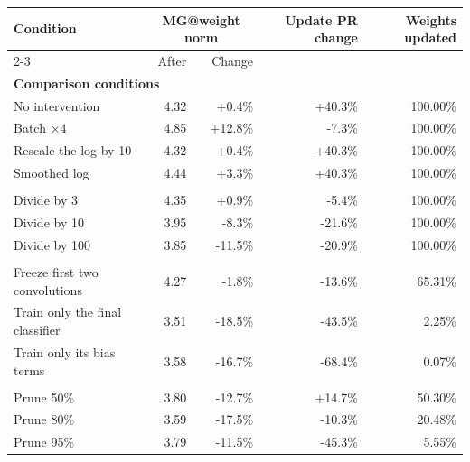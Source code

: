 \begin{tabular}{lrrrr}
\toprule
Condition & \multicolumn{2}{c}{MG@weight norm} & Update PR change & Weights updated \\
\cmidrule(lr){2-3}
 & After & Change & & \\
\midrule
\multicolumn{5}{l}{\textbf{Comparison conditions}} \\
No intervention & 4.32 & +0.4\% & +40.3\% & 100.00\% \\
Batch $\times4$ & 4.85 & +12.8\% & -7.3\% & 100.00\% \\
Rescale the log by 10 & 4.32 & +0.4\% & +40.3\% & 100.00\% \\
Smoothed log & 4.44 & +3.3\% & +40.3\% & 100.00\% \\
\addlinespace
\multicolumn{5}{l}{\textbf{Learning-rate reductions}} \\
Divide by 3 & 4.35 & +0.9\% & -5.4\% & 100.00\% \\
Divide by 10 & 3.95 & -8.3\% & -21.6\% & 100.00\% \\
Divide by 100 & 3.85 & -11.5\% & -20.9\% & 100.00\% \\
\addlinespace
\multicolumn{5}{l}{\textbf{Freezing}} \\
Freeze first two convolutions & 4.27 & -1.8\% & -13.6\% & 65.31\% \\
Train only the final classifier & 3.51 & -18.5\% & -43.5\% & 2.25\% \\
Train only its bias terms & 3.58 & -16.7\% & -68.4\% & 0.07\% \\
\addlinespace
\multicolumn{5}{l}{\textbf{Pruning}} \\
Prune 50\% & 3.80 & -12.7\% & +14.7\% & 50.30\% \\
Prune 80\% & 3.59 & -17.5\% & -10.3\% & 20.48\% \\
Prune 95\% & 3.79 & -11.5\% & -45.3\% & 5.55\% \\
\bottomrule
\end{tabular}
